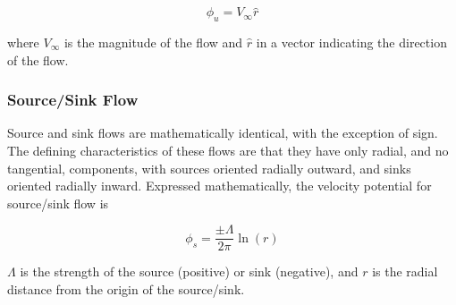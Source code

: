 \begin{equation}
\label{eqn:uniformflow}
    \phi_{u} = V_\infty \hat{r}
\end{equation}

\noindent where \(V_\infty\) is the magnitude of the flow and \(\hat{r}\) in a vector indicating the direction of the flow.


\subsubsection{Source/Sink Flow}

\begin{marginfigure}
    
\end{marginfigure}
\begin{marginfigure}
    
\end{marginfigure}

Source and sink flows are mathematically identical, with the exception of sign.
%
The defining characteristics of these flows are that they have only radial, and no tangential, components, with sources oriented radially outward, and sinks oriented radially inward.
%
Expressed mathematically, the velocity potential for source/sink flow is

\begin{equation}
\label{eqn:sourceflow}
    \phi_s = \frac{\pm\Lambda}{2\pi} \ln(r)
\end{equation}

\where \(\Lambda\) is the strength of the source (positive) or sink (negative), and \(r\) is the radial distance from the origin of the source/sink.



%     



